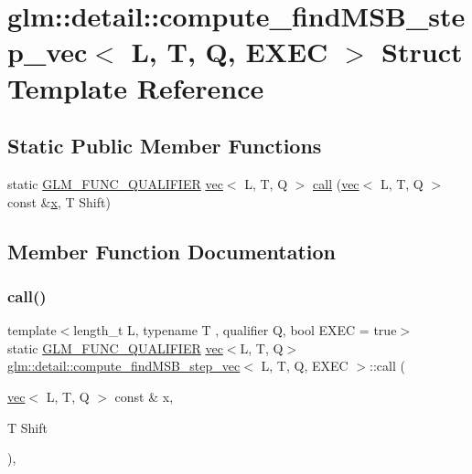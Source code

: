 \hypertarget{structglm_1_1detail_1_1compute__find_m_s_b__step__vec}{}\section{glm\+:\+:detail\+:\+:compute\+\_\+find\+M\+S\+B\+\_\+step\+\_\+vec$<$ L, T, Q, E\+X\+EC $>$ Struct Template Reference}
\label{structglm_1_1detail_1_1compute__find_m_s_b__step__vec}
\subsection*{Static Public Member Functions}
\begin{DoxyCompactItemize}
\item 
static \mbox{\hyperlink{setup_8hpp_a33fdea6f91c5f834105f7415e2a64407}{G\+L\+M\+\_\+\+F\+U\+N\+C\+\_\+\+Q\+U\+A\+L\+I\+F\+I\+ER}} \mbox{\hyperlink{structglm_1_1vec}{vec}}$<$ L, T, Q $>$ \mbox{\hyperlink{structglm_1_1detail_1_1compute__find_m_s_b__step__vec_ad2bb7c372d1a7b44269af72d8f7dbc73}{call}} (\mbox{\hyperlink{structglm_1_1vec}{vec}}$<$ L, T, Q $>$ const \&\mbox{\hyperlink{_s_d_l__opengl_8h_ad0e63d0edcdbd3d79554076bf309fd47}{x}}, T Shift)
\end{DoxyCompactItemize}


\subsection{Member Function Documentation}
\mbox{\label{structglm_1_1detail_1_1compute__find_m_s_b__step__vec_ad2bb7c372d1a7b44269af72d8f7dbc73}} 
\subsubsection{\texorpdfstring{call()}{call()}}
{\footnotesize\ttfamily template$<$length\+\_\+t L, typename T , qualifier Q, bool E\+X\+EC = true$>$ \\
static \mbox{\hyperlink{setup_8hpp_a33fdea6f91c5f834105f7415e2a64407}{G\+L\+M\+\_\+\+F\+U\+N\+C\+\_\+\+Q\+U\+A\+L\+I\+F\+I\+ER}} \mbox{\hyperlink{structglm_1_1vec}{vec}}$<$L, T, Q$>$ \mbox{\hyperlink{structglm_1_1detail_1_1compute__find_m_s_b__step__vec}{glm\+::detail\+::compute\+\_\+find\+M\+S\+B\+\_\+step\+\_\+vec}}$<$ L, T, Q, E\+X\+EC $>$\+::call (\begin{DoxyParamCaption}\item[{\mbox{\hyperlink{structglm_1_1vec}{vec}}$<$ L, T, Q $>$ const \&}]{x,  }\item[{T}]{Shift }\end{DoxyParamCaption})\hspace{0.3cm}{\ttfamily [inline]}, {\ttfamily [static]}}



